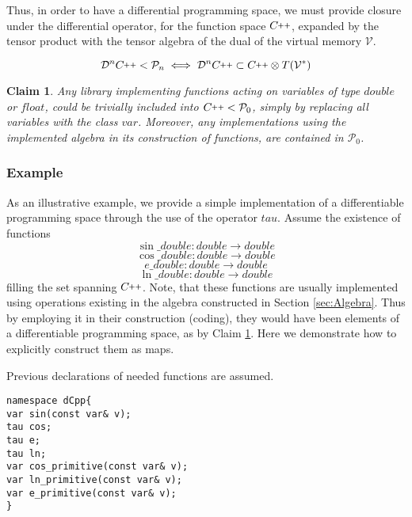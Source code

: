 \documentclass{article}
\newcommand{\VV}{\mathcal{V}}
\newcommand{\CC}{C\nolinebreak\hspace{-.05em}\raisebox{.4ex}{\tiny\bf +}\nolinebreak\hspace{-.10em}\raisebox{.4ex}{\tiny\bf +}}
\def\CC{{C\nolinebreak[4]\hspace{-.05em}\raisebox{.4ex}{\tiny\bf ++}}}
\newcommand{\dP}{\mathcal{P}}
\newcommand{\DD}{\mathcal{D}}
\newtheorem{trditev}{Claim}[section]
\begin{document}
              Thus, in order to have a differential programming space, we must provide closure under the differential operator, for the function space $\CC$, expanded by the tensor product with the tensor algebra of the dual of the virtual memory $\VV$.
              
              \begin{equation}
              \DD^n\CC<\dP_n\iff\DD^n\CC\subset\CC\otimes T(\VV^*)
              \end{equation}

\begin{trditev}\label{trd:library}
Any library implementing functions acting on variables of type $double$ or $float$, could be trivially included into $\CC<\dP_0$, simply by replacing all variables with the class $var$. Moreover, any implementations using the implemented algebra in its construction of functions, are contained in $\dP_0$.
\end{trditev}

\subsubsection{Example}
  
As an illustrative example, we provide a simple implementation of a differentiable programming space through the use of the operator $tau$. 
Assume the existence of functions
\begin{equation}
\sin\_double:double\to double
\end{equation}
\begin{equation}
\cos\_double:double\to double
\end{equation} 
\begin{equation}
e\_double:double\to double
\end{equation}  
\begin{equation}
\ln\_double:double\to double
\end{equation} 
filling the set spanning $\CC$. Note, that these functions are usually implemented using operations existing in the algebra constructed in Section \ref{sec:Algebra}. Thus by employing it in their construction (coding), they would have been elements of a differentiable programming space, as by Claim \ref{trd:library}. Here we demonstrate how to explicitly construct them as maps.

Previous declarations of needed functions are assumed. 

\begin{lstlisting}
namespace dCpp{
var sin(const var& v);
tau cos;
tau e;
tau ln;
var cos_primitive(const var& v);
var ln_primitive(const var& v);
var e_primitive(const var& v);
}
\end{lstlisting}
\end{document}
